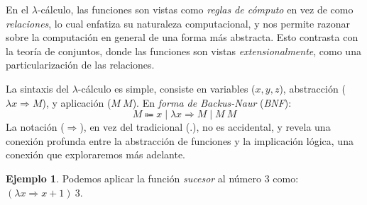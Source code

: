 \documentclass[
  a4paper, 
  10pt, 
  parskip=half, 
  toc=bibliography,
]{scrbook}
\theoremstyle{definition}
\theoremstyle{bolddef}
\newtheorem{example}[theorem]{Ejemplo}
\renewcommand{\mapsto}{\Rightarrow}
\begin{document}
En el \(\lambda\)-cálculo, las funciones son vistas como \emph{reglas de cómputo} en vez de como
\emph{relaciones}, lo cual enfatiza su naturaleza computacional, y
nos permite razonar sobre la computación en general de una forma más abstracta. Esto contrasta
con la teoría de conjuntos, donde las funciones son vistas \emph{extensionalmente},
como una particularización de las relaciones.

La sintaxis del \(\lambda\)-cálculo es simple, consiste en variables (\(x, y, z\)),
abstracción (\(\lambda x \mapsto M\)), y aplicación (\(M \ M\)). En 
\emph{forma de Backus-Naur} (\emph{BNF}):
\[
  M \Coloneqq x \mid \lambda x \mapsto M \mid M \ M
\]
La notación (\(\mapsto\)), en vez del tradicional (.), no es accidental, y revela una conexión
profunda entre la abstracción de funciones y la implicación lógica, una conexión que exploraremos más adelante.

\begin{example}\label{ex:lambda_expr}
Podemos aplicar la función \emph{sucesor} al número \(3\) como:
\(
(\lambda x \mapsto x + 1) \ 3
\).
\end{example}
\end{document}
